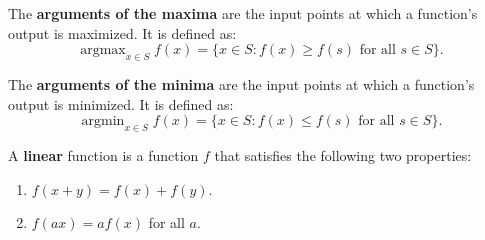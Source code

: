 \documentclass{huhtakm-template-book-v2}
\DeclareMathOperator*{\argmin}{argmin}
\DeclareMathOperator*{\argmax}{argmax}
\begin{document}
    \begin{defn}
        The \textbf{arguments of the maxima} are the input points at which a function's output is maximized. It is defined as:
        \begin{equation*}
            \argmax_{x \in S}f(x) = \{x \in S:f(x) \geq f(s)\text{ for all }s \in S\}.
        \end{equation*}
    \end{defn}
    \begin{defn}
        The \textbf{arguments of the minima} are the input points at which a function's output is minimized. It is defined as:
        \begin{equation*}
            \argmin_{x \in S}f(x) = \{x \in S:f(x) \leq f(s)\text{ for all }s \in S\}.
        \end{equation*}
    \end{defn}
    \begin{defn}
        A \textbf{linear} function is a function $f$ that satisfies the following two properties:
        \begin{enumerate}
            \item $f(x+y) = f(x)+f(y)$.
            \item $f(ax) = af(x)$ for all $a$.
        \end{enumerate}
    \end{defn}
    \newpage
\end{document}
